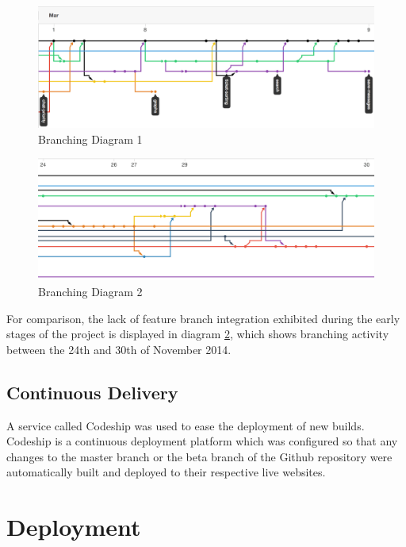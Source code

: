 \documentclass[a4paper]{l3proj}
\begin{document}
\begin{figure}[ht, ref={\alph}]
\centering
\includegraphics[scale=0.5]{diagram}
\caption{Branching Diagram 1}
\label{figure:diagram1}
\end{figure} 

\begin{figure}[ht, ref={\alph}]
\centering
\includegraphics[scale=0.5]{diagram2}
\caption{Branching Diagram 2}
\label{figure:diagram2}
\end{figure} 

For comparison, the lack of feature branch integration exhibited during the early stages of the project is displayed in diagram \ref{figure:diagram2}, which shows branching activity between the 24th and 30th of November 2014.

\subsection{Continuous Delivery}
\label{continuousDelivery}

A service called Codeship was used to ease the deployment of new builds. Codeship \cite{site:codeship} is a continuous deployment platform which was configured so that any changes to the master branch or the beta branch of the Github repository were automatically built and deployed to their respective live websites.

\section{Deployment}
\label{deployment}
\end{document}

